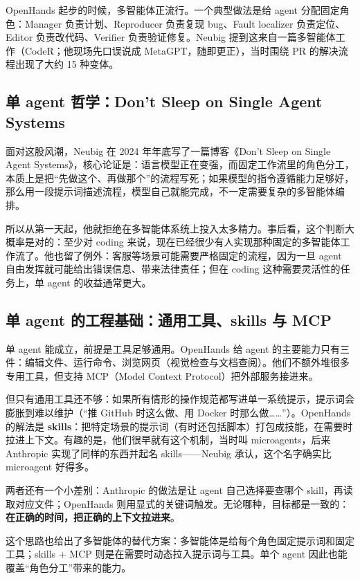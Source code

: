 \documentclass[a4paper]{article}
\begin{document}
OpenHands 起步的时候，多智能体正流行。一个典型做法是给 agent 分配固定角色：Manager 负责计划、Reproducer 负责复现 bug、Fault localizer 负责定位、Editor 负责改代码、Verifier 负责验证修复。Neubig 提到这来自一篇多智能体工作（CodeR；他现场先口误说成 MetaGPT，随即更正），当时围绕 PR 的解决流程出现了大约 15 种变体。

\subsection{单 agent 哲学：Don't Sleep on Single Agent Systems}

面对这股风潮，Neubig 在 2024 年年底写了一篇博客《Don't Sleep on Single Agent Systems》，核心论证是：语言模型正在变强，而固定工作流里的角色分工，本质上是把“先做这个、再做那个”的流程写死；如果模型的指令遵循能力足够好，那么用一段提示词描述流程，模型自己就能完成，不一定需要复杂的多智能体编排。

所以从第一天起，他就拒绝在多智能体系统上投入太多精力。事后看，这个判断大概率是对的：至少对 coding 来说，现在已经很少有人实现那种固定的多智能体工作流了。他也留了例外：客服等场景可能需要严格固定的流程，因为一旦 agent 自由发挥就可能给出错误信息、带来法律责任；但在 coding 这种需要灵活性的任务上，单 agent 的收益通常更大。

\subsection{单 agent 的工程基础：通用工具、skills 与 MCP}

单 agent 能成立，前提是工具足够通用。OpenHands 给 agent 的主要能力只有三件：编辑文件、运行命令、浏览网页（视觉检查与文档查阅）。他们不额外堆很多专用工具，但支持 MCP（Model Context Protocol）把外部服务接进来。

但只有通用工具还不够：如果所有情形的操作规范都写进单一系统提示，提示词会膨胀到难以维护（“推 GitHub 时这么做、用 Docker 时那么做……”）。OpenHands 的解法是 \textbf{skills}：把特定场景的提示词（有时还包括脚本）打包成技能，在需要时拉进上下文。有趣的是，他们很早就有这个机制，当时叫 microagents，后来 Anthropic 实现了同样的东西并起名 skills——Neubig 承认，这个名字确实比 microagent 好得多。

两者还有一个小差别：Anthropic 的做法是让 agent 自己选择要查哪个 skill，再读取对应文件；OpenHands 则用显式的关键词触发。无论哪种，目标都是一致的：\textbf{在正确的时间，把正确的上下文拉进来}。

这个思路也给出了多智能体的替代方案：多智能体是给每个角色固定提示词和固定工具；skills + MCP 则是在需要时动态拉入提示词与工具。单个 agent 因此也能覆盖“角色分工”带来的能力。
\end{document}
